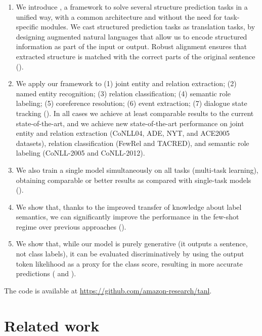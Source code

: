 \begin{enumerate}[leftmargin=*]
    \item  We introduce {\ourmodel}, a framework to solve several structure prediction tasks in a unified way, with a common architecture and without the need for task-specific modules.
    We cast structured prediction tasks as translation tasks, by designing augmented natural languages that allow us to encode structured information as part of the input or output.
    Robust alignment ensures that extracted structure is matched with the correct parts of the original sentence ().

    \item We apply our framework to (1) joint entity and relation extraction; (2) named entity recognition; (3) relation classification; (4) semantic role labeling; (5) coreference resolution; (6) event extraction; (7) dialogue state tracking (). In all cases we achieve at least comparable results to the current state-of-the-art, and we achieve new state-of-the-art performance on joint entity and relation extraction (CoNLL04, ADE, NYT, and ACE2005 datasets), relation classification (FewRel and TACRED), and semantic role labeling (CoNLL-2005 and CoNLL-2012).

    \item We also train a single model simultaneously on all tasks (multi-task learning), obtaining comparable or better results as compared with single-task models ().
    
    \item We show that, thanks to the improved transfer of knowledge about label semantics, we can significantly improve the performance in the few-shot regime over previous approaches ().
    
    \item We show that, while our model is purely generative (it outputs a sentence, not class labels), it can be evaluated discriminatively by using the output token likelihood as a proxy for the class score, resulting in more accurate predictions ( and 
    ).
\end{enumerate}

The code is available at \url{https://github.com/amazon-research/tanl}.

\section{Related work} \label{sec:related} %

